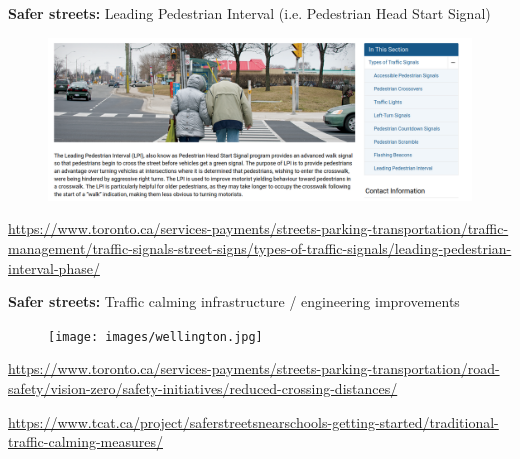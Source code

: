 \documentclass[aspectratio=169]{beamer}
\begin{document}
\begin{frame}
	
	\textbf{Safer streets:} Leading Pedestrian Interval (i.e. Pedestrian Head Start Signal)
	
	\begin{figure}
		\centering
		\includegraphics[width=1\linewidth]{images/pedestrian_leading.png}
	\end{figure}
	
	\tiny\url{https://www.toronto.ca/services-payments/streets-parking-transportation/traffic-management/traffic-signals-street-signs/types-of-traffic-signals/leading-pedestrian-interval-phase/}
	
\end{frame}



\begin{frame}
	
	\textbf{Safer streets:} Traffic calming infrastructure / engineering improvements
	
	\begin{figure}
		\centering
		\texttt{[image: images/wellington.jpg]}
	\end{figure}

	\tiny\url{https://www.toronto.ca/services-payments/streets-parking-transportation/road-safety/vision-zero/safety-initiatives/reduced-crossing-distances/}
	
	\tiny\url{https://www.tcat.ca/project/saferstreetsnearschools-getting-started/traditional-traffic-calming-measures/}
	
\end{frame}
\end{document}
